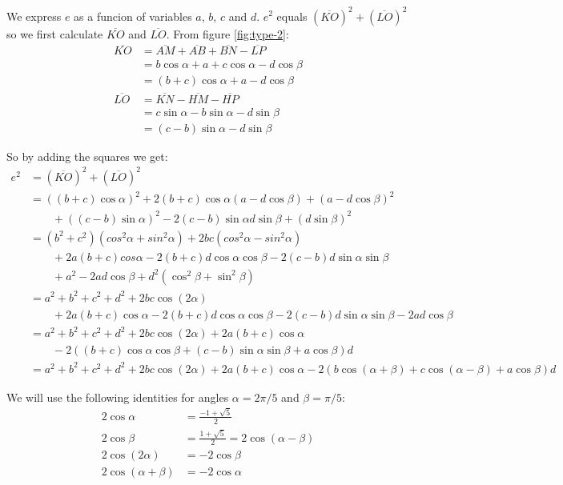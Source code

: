 \documentclass[11pt]{article}
\begin{document}
We express $e$ as a funcion of variables $a$, $b$, $c$ and $d$.
$e^2$ equals $(\overline{KO})^2 + (\overline{LO})^2$ so we first calculate 
$\overline{KO}$ and $\overline{LO}$. From figure \ref{fig:type-2}:
\begin{align}
\overline{KO} &= \overline{AM} + \overline{AB} + \overline{BN} - \overline{LP} \nonumber\\
              &= b\cos{\alpha} + a + c\cos{\alpha} - d\cos{\beta} \nonumber\\
              &= (b+c)\cos{\alpha} + a  - d\cos{\beta}\\
\overline{LO} &= \overline{KN} - \overline{HM} - \overline{HP} \nonumber\\
              &= c\sin{\alpha} - b\sin{\alpha} - d\sin{\beta} \nonumber\\
              &= (c-b)\sin{\alpha} - d\sin{\beta}
\end{align}

So by adding the squares we get:
\begin{align}
e^2 &= (\overline{KO})^2 + (\overline{LO})^2 \nonumber\\
 &= ((b+c)\cos{\alpha})^2 + 2(b+c)\cos{\alpha}(a - d\cos{\beta}) + (a - d\cos{\beta})^2 \nonumber\\
  &\qquad + ((c-b)\sin{\alpha})^2 - 2(c-b)\sin{\alpha}d\sin{\beta} + (d\sin{\beta})^2 \nonumber\\
 &= (b^2+c^2)(cos^2{\alpha}+sin^2{\alpha}) + 2bc(cos^2{\alpha}-sin^2{\alpha}) \nonumber\\
  &\qquad + 2a(b+c)cos{\alpha} - 2(b+c)d\cos{\alpha}\cos{\beta} - 2(c-b)d\sin{\alpha}\sin{\beta} \nonumber\\
  &\qquad + a^2 - 2ad\cos{\beta} + d^2(\cos^2{\beta} + \sin^2{\beta}) \nonumber\\
 &= a^2+b^2+c^2+d^2 + 2bc\cos{(2\alpha)} \nonumber\\
  &\qquad + 2a(b+c)\cos{\alpha} - 2(b+c)d\cos{\alpha}\cos{\beta} - 2(c-b)d\sin{\alpha}\sin{\beta} - 2ad\cos{\beta} \nonumber\\
 &= a^2+b^2+c^2+d^2 + 2bc\cos{(2\alpha)} + 2a(b+c)\cos{\alpha} \nonumber\\
  &\qquad- 2((b+c)\cos{\alpha}\cos{\beta} + (c-b)\sin{\alpha}\sin{\beta} +a\cos{\beta})d \nonumber\\
 &= \boxed{a^2+b^2+c^2+d^2 + 2bc\cos{(2\alpha)} + 2a(b+c)\cos{\alpha} - 2(b\cos{(\alpha+\beta)} + c\cos{(\alpha-\beta)} +a\cos{\beta})d} \end{align}

We will use the following identities for angles $\alpha = 2\pi/5$ and $\beta = \pi/5$:
\begin{align}
2\cos{\alpha} &= \frac{-1+\sqrt{5}}{2} \\
2\cos{\beta} &= \frac{1+\sqrt{5}}{2} = 2\cos{(\alpha-\beta)} \\
2\cos{(2\alpha)} &= -2\cos{\beta} \\
2\cos{(\alpha+\beta)} &= -2\cos{\alpha}
\end{align}
\end{document}
